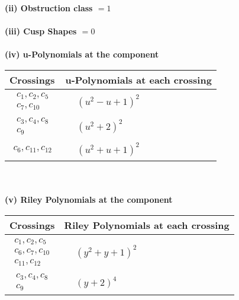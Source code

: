 \documentclass[1p]{elsarticle_modified}
\theoremstyle{definition}
\begin{document}
\flushleft \textbf{(ii) Obstruction class $= 1$}\\~\\
\flushleft \textbf{(iii) Cusp Shapes $= 0$}\\~\\
\newpage\renewcommand{\arraystretch}{1}
\flushleft \textbf{(iv) u-Polynomials at the component}\newline \\
\begin{tabular}{m{50pt}|m{274pt}}
Crossings & \hspace{64pt}u-Polynomials at each crossing \\
\hline $$\begin{aligned}c_{1},c_{2},c_{5}\\c_{7},c_{10}\end{aligned}$$&$\begin{aligned}
&(u^2- u+1)^2
\end{aligned}$\\
\hline $$\begin{aligned}c_{3},c_{4},c_{8}\\c_{9}\end{aligned}$$&$\begin{aligned}
&(u^2+2)^2
\end{aligned}$\\
\hline $$\begin{aligned}c_{6},c_{11},c_{12}\end{aligned}$$&$\begin{aligned}
&(u^2+u+1)^2
\end{aligned}$\\
\hline
\end{tabular}\\~\\
\newpage\renewcommand{\arraystretch}{1}
\flushleft \textbf{(v) Riley Polynomials at the component}\newline \\
\begin{tabular}{m{50pt}|m{274pt}}
Crossings & \hspace{64pt}Riley Polynomials at each crossing \\
\hline $$\begin{aligned}c_{1},c_{2},c_{5}\\c_{6},c_{7},c_{10}\\c_{11},c_{12}\end{aligned}$$&$\begin{aligned}
&(y^2+y+1)^2
\end{aligned}$\\
\hline $$\begin{aligned}c_{3},c_{4},c_{8}\\c_{9}\end{aligned}$$&$\begin{aligned}
&(y+2)^4
\end{aligned}$\\
\hline
\end{tabular}\\~\\
\end{document}
